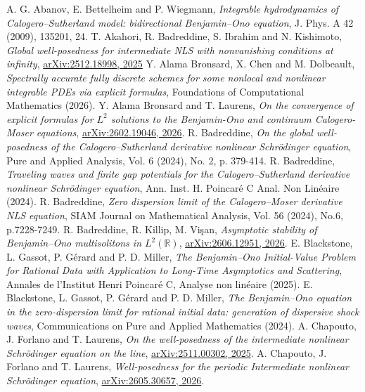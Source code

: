 \documentclass[10pt]{article}
\numberwithin{equation}{section}
\numberwithin{theorem}{section}
\begin{document}
\begin{thebibliography}{}
 {\sc A. G. Abanov, E. Bettelheim and P. Wiegmann}, {\em Integrable hydrodynamics of Calogero--Sutherland model: bidirectional Benjamin--Ono equation}, J. Phys. A 42 (2009), 135201, 24.
 {\sc T. Akahori, R. Badreddine, S. Ibrahim and N. Kishimoto}, {\em Global well-posedness for intermediate NLS with nonvanishing conditions at infinity}, \href{https://arxiv.org/abs/2512.18998v3}{arXiv:2512.18998, 2025}
 {\sc Y. Alama Bronsard, X. Chen and M. Dolbeault}, {\em  Spectrally accurate fully discrete schemes for some nonlocal and nonlinear integrable PDEs via explicit formulas},  Foundations of Computational Mathematics (2026).
  {\sc Y. Alama Bronsard and T. Laurens}, {\em On the convergence of explicit formulas for $L^2$ solutions to the Benjamin-Ono and continuum Calogero-Moser equations}, \href{https://arxiv.org/abs/2602.19046}{arXiv:2602.19046, 2026}.
 {\sc R. Badreddine}, {\em On the global well-posedness of the Calogero--Sutherland derivative nonlinear Schrödinger equation}, Pure and Applied Analysis, Vol. 6 (2024), No. 2, p. 379-414.
 {\sc R. Badreddine}, {\em Traveling waves and finite gap potentials for the Calogero--Sutherland derivative nonlinear Schrödinger equation}, Ann. Inst. H. Poincaré C Anal. Non Linéaire (2024).
 {\sc R. Badreddine}, {\em Zero dispersion limit of the Calogero--Moser derivative NLS equation}, SIAM Journal on Mathematical Analysis, Vol. 56 (2024), No.6, p.7228-7249.
 {\sc R. Badreddine, R. Killip, M. Vişan}, {\em Asymptotic stability of Benjamin--Ono multisolitons in $L^2(\mathbb R)$}, \href{https://arxiv.org/abs/2606.12951v1}{arXiv:2606.12951, 2026}.
 {\sc E. Blackstone, L. Gassot, P. Gérard and P. D. Miller}, {\em The Benjamin--Ono Initial-Value Problem for Rational Data with Application to Long-Time Asymptotics and Scattering},  Annales de l'Institut Henri Poincaré C, Analyse non linéaire (2025).
 {\sc E. Blackstone, L. Gassot, P. Gérard and P. D. Miller}, {\em The Benjamin--Ono equation in the zero-dispersion limit for rational initial data: generation of dispersive shock waves}, Communications on Pure and Applied Mathematics (2024).
 {\sc A. Chapouto, J. Forlano and T. Laurens}, {\em On the well-posedness of the intermediate nonlinear Schrödinger equation on the line}, \href{https://arxiv.org/abs/2511.00302}{arXiv:2511.00302, 2025}.
 {\sc A. Chapouto, J. Forlano and T. Laurens}, {\em Well-posedness for the periodic Intermediate nonlinear Schrödinger equation}, \href{https://arxiv.org/abs/2511.00302}{arXiv:2605.30657, 2026}.

\end{thebibliography}
\end{document}
